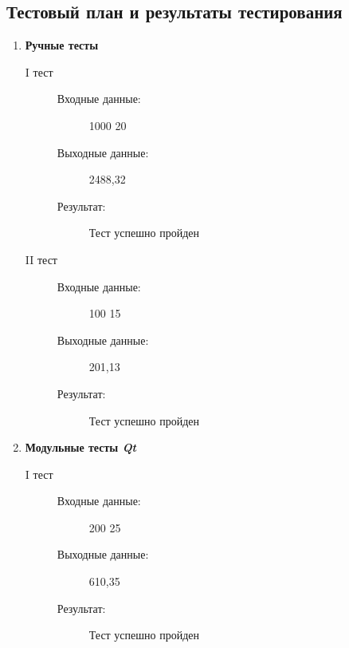 \documentclass[12pt,a4paper]{report}
\begin{document}
\subsection{Тестовый план и результаты тестирования}
\begin{enumerate}
\item \textbf{Ручные тесты}
\begin{description}
\item[I тест]
\hspace{\parindent}
\begin{flushleft}
\begin{description}
\item[Входные данные:] 1000 20
\item[Выходные данные:] 2488,32
\item[Результат:] Тест успешно пройден
\end{description}
\end{flushleft}
\end{description}

\begin{description}
\item[II тест]
\hspace{\parindent}
\begin{flushleft}
\begin{description}
\item[Входные данные:] 100 15
\item[Выходные данные:] 201,13
\item[Результат:] Тест успешно пройден
\end{description}
\end{flushleft}
\end{description}

\item \textbf{Модульные тесты \textit{Qt}}
\begin{description}
\item[I тест]
\hspace{\parindent}
\begin{flushleft}
\begin{description}
\item[Входные данные:] 200 25
\item[Выходные данные:] 610,35
\item[Результат:] Тест успешно пройден
\end{description}
\end{flushleft}
\end{description}


\end{enumerate}
\end{document}
